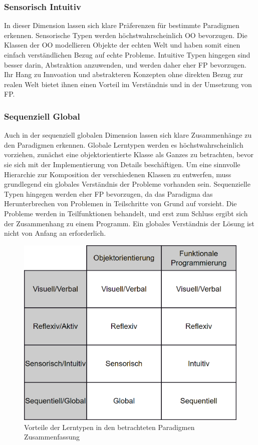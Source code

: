 \subsubsection{Sensorisch Intuitiv}
In dieser Dimension lassen sich klare Präferenzen für bestimmte Paradigmen erkennen. Sensorische Typen werden höchstwahrscheinlich OO bevorzugen. Die Klassen der OO modellieren Objekte der echten Welt und haben somit einen einfach verständlichen Bezug auf echte Probleme.
Intuitive Typen hingegen sind besser darin, Abstraktion anzuwenden, und werden daher eher FP bevorzugen.
Ihr Hang zu Innvoation und abstrakteren Konzepten ohne direkten Bezug zur realen Welt bietet ihnen einen Vorteil im Verständnis und in der Umsetzung von FP.

\subsubsection{Sequenziell Global}
Auch in der sequenziell globalen Dimension lassen sich klare Zusammenhänge zu den Paradigmen erkennen. Globale Lerntypen werden es höchstwahrscheinlich vorziehen, zunächst eine objektorientierte Klasse als Ganzes zu betrachten, bevor sie sich mit der Implementierung von Details beschäftigen. Um eine sinnvolle Hierarchie zur Komposition der verschiedenen Klassen zu entwerfen, muss grundlegend ein globales Verständnis der Probleme vorhanden sein.
Sequenzielle Typen hingegen werden eher FP bevorzugen, da das Paradigma das Herunterbrechen von Problemen in Teilschritte von Grund auf vorsieht. Die Probleme werden in Teilfunktionen behandelt, und erst zum Schluss ergibt sich der Zusammenhang zu einem Programm. Ein globales Verständnis der Lösung ist nicht von Anfang an erforderlich.

\begin{figure}[H]
    \centering
    \includegraphics[width=1\linewidth]{Figures/Section_3/Styles_Paradigms}
    \caption{Vorteile der Lerntypen in den betrachteten Paradigmen Zusammenfassung}
\end{figure}

